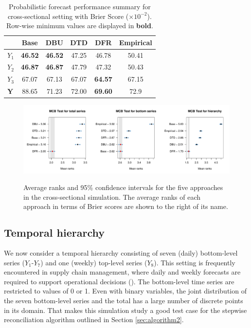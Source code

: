 \documentclass[a4paper,review,11pt,authoryear]{elsarticle}
\theoremstyle{definition}
\begin{document}
    \begin{table}
      \centering
      \caption{\label{tab:sim_crosssectional_res_dist} Probabilistic forecast performance summary for cross-sectional setting with Brier Score ($\times 10^{-2}$). Row-wise minimum values are displayed in \textbf{bold}.}
      \begin{tabular}{lccccc}
      \toprule
      ~ & Base & DBU & DTD & DFR & Empirical \\ \midrule
      $Y_1$ & \textbf{46.52} & \textbf{46.52} & 47.25 & 46.78 & 50.41 \\ 
      $Y_2$ & \textbf{46.87} & \textbf{46.87} & 47.79 & 47.32 & 50.43 \\ 
      $Y_3$ & 67.07 & 67.13 & 67.07 & \textbf{64.57} & 67.15 \\ 
      $\mathbf{Y}$ & 88.65 & 71.23 & 72.00 & \textbf{69.60} & 72.9 \\ 
      \bottomrule
      \end{tabular}
    \end{table}

    \begin{figure}
	\centering
	\caption{Average ranks and 95\% confidence intervals for the five approaches in the cross-sectional simulation. The average ranks of each approach in terms of Brier scores are shown to the right of its name.}
	\includegraphics[width=\textwidth]{figures/sim_cross_mcb.pdf}
    \label{fig:mcb_crosssectional} 
    \end{figure}


     \subsection{Temporal hierarchy}\label{sec:temporal_simu}
     We now consider a temporal hierarchy consisting of seven (daily) bottom-level series ($Y_1$-$Y_7$) and one (weekly) top-level series ($Y_8$).
     This setting is frequently encountered in supply chain management, where daily and weekly forecasts are required to support operational decisions (\citealp{syntetosSupplyChainForecasting2016}).
     The bottom-level time series are restricted to values of 0 or 1.
     Even with binary variables, the joint distribution of the seven bottom-level series and the total has a large number of discrete points in its domain. That makes this simulation study a good test case for the stepwise reconciliation algorithm outlined in Section \ref{sec:algorithm2}.
\end{document}
